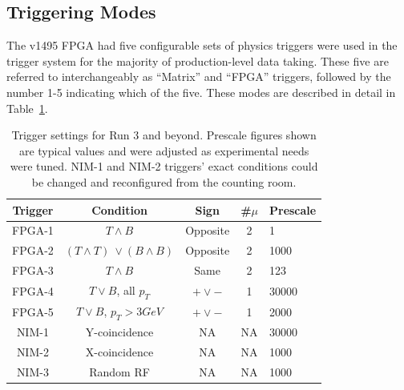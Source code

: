 \subsection{Triggering Modes}

The v1495 FPGA had five configurable sets of physics triggers were used in the trigger system for the majority of production-level data taking. These five are referred to interchangeably as ``Matrix'' and ``FPGA'' triggers, followed by the number 1-5 indicating which of the five. These modes are described in detail in Table~\ref{tab:trigger-settings}.

\begin{table}[bthp]\centering
	\begin{tabular}{c|cccl}
		\hline
		Trigger & Condition       & Sign    & \#$\mu$ & Prescale\\
		\hline
		FPGA-1   & $T \land B$                        & Opposite  & 2        & 1    \\
		FPGA-2   & $(T \land T)\ \lor (B \land B)$  & Opposite  & 2        & 1000 \\
		FPGA-3   & $T \land B$                        & Same        & 2        & 123  \\
		FPGA-4   & $T \lor B$, all $p_T$            & $+ \lor -$& 1        & 30000\\
		FPGA-5   & $T \lor B$, $p_T > 3GeV$            & $+ \lor -$& 1        & 2000 \\
		NIM-1    & Y-coincidence                     & NA        & NA    & 30000\\
		NIM-2    & X-coincidence                    & NA        & NA    & 1000 \\
		NIM-3     & Random RF                        & NA        & NA    & 1000 \\
		\hline
	\end{tabular}
	\caption{Trigger settings for Run 3 and beyond. Prescale figures shown are typical values and were adjusted as experimental needs were tuned. NIM-1 and NIM-2 triggers' exact conditions could be changed and reconfigured from the counting room.}
	\label{tab:trigger-settings}
\end{table}

